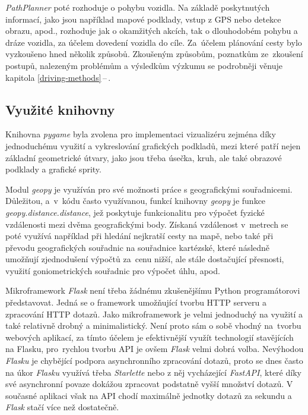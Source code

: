 \documentclass[czech, bachelor]{diploma}
\newcommand{\filipref}[1]{\ref{#1}\,--\,\nameref{#1}}
\begin{document}
\emph{PathPlanner} poté rozhoduje o pohybu vozidla. Na základě poskytnutých informací, jako jsou například mapové podklady, vstup
z GPS nebo detekce obrazu, apod., rozhoduje jak o okamžitých akcích, tak o dlouhodobém pohybu a dráze vozidla, za účelem dovedení
vozidla do cíle. Za~účelem plánování cesty bylo vyzkoušeno hned několik způsobů. Zkoušeným způsobům, poznatkům ze~zkoušení
postupů, nalezeným problémům a výsledkům výzkumu se podrobněji věnuje kapitola \filipref{driving-methods}.

\subsection{Využité knihovny}

Knihovna \emph{pygame} byla zvolena pro implementaci vizualizéru zejména díky jednoduchému využití a vykreslování grafických
podkladů, mezi které patří nejen základní geometrické útvary, jako jsou třeba úsečka, kruh, ale také obrazové podklady a grafické
sprity.

Modul \emph{geopy} je využíván pro své možnosti práce s geografickými souřadnicemi. Důležitou, a~v~kódu často využívanou, funkcí
knihovny \emph{geopy} je funkce \emph{geopy.distance.distance}, jež poskytuje funkcionalitu pro výpočet fyzické vzdálenosti mezi
dvěma geografickými body. Získaná vzdálenost v~metrech se poté využívá například při hledání nejkratší cesty na mapě, nebo také
při převodu geografických souřadnic na souřadnice kartézské, které následně umožňují zjednodušení výpočtů za~cenu nižší, ale stále
dostačující přesnosti, využití goniometrických souřadnic pro výpočet úhlu, apod.

Mikroframework \emph{Flask} není třeba žádnému zkušenějšímu Python programátorovi představovat. Jedná se o framework umožňující
tvorbu HTTP serveru a zpracování HTTP dotazů. Jako mikroframework je velmi jednoduchý na využití a také relativně drobný
a minimalistický. Není proto sám o sobě vhodný na~tvorbu webových aplikací, za tímto účelem je efektivnější využít technologií
stavějících na Flasku, pro~rychlou tvorbu API je ovšem \emph{Flask} velmi dobrá volba. Nevýhodou \emph{Flasku} je chybějící
podpora asynchronního zpracování dotazů, proto se dnes často na úkor \emph{Flasku} využívá třeba \emph{Starlette} nebo z něj
vycházející \emph{FastAPI}, které díky své asynchronní povaze dokážou zpracovat podstatně vyšší množství dotazů. V současné
aplikaci však na API chodí maximálně jednotky dotazů za sekundu a \emph{Flask} stačí více než dostatečně.
\end{document}
